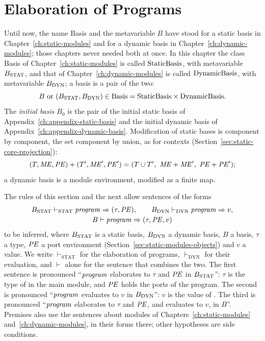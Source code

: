\section{Elaboration of Programs}\label{sec:programs-elaboration}

Until now, the name Basis and the metavariable $B$ have stood for a static
basis in Chapter~\ref{ch:static-modules} and for a dynamic basis in
Chapter~\ref{ch:dynamic-modules}; those chapters never needed both at once.
In this chapter the class Basis of Chapter~\ref{ch:static-modules} is called
$\mathrm{StaticBasis}$, with metavariable $B_{\mathrm{STAT}}$, and that of
Chapter~\ref{ch:dynamic-modules} is called $\mathrm{DynamicBasis}$, with
metavariable $B_{\mathrm{DYN}}$; a basis is a pair of the two:
\[
  B\ \text{or}\ (\pgBstat,\pgBdyn)\in\Basis=\pgStaticBasis\times\pgDynamicBasis .
\]
The \emph{initial basis} $B_0$ is the pair of the initial static basis of
Appendix~\ref{ch:appendix-static-basis} and the initial dynamic basis of
Appendix~\ref{ch:appendix-dynamic-basis}. Modification of static bases is
component by component, the set component by union, as for contexts
(Section~\ref{sec:static-core-projection}):
\[
  (T,\ME,\PE)+(T',\ME',\PE')=(T\cup T',\ \ME+\ME',\ \PE+\PE') ;
\]
a dynamic basis is a module environment, modified as a finite map.

The rules of this section and the next allow sentences of the forms
\[
  \begin{array}{c}
  B_{\mathrm{STAT}} \vdash_{\mathrm{STAT}} \mathit{program} \Rightarrow (\tau,\mathit{PE}),\qquad
  B_{\mathrm{DYN}} \vdash_{\mathrm{DYN}} \mathit{program} \Rightarrow v,\\[0.5ex]
  B \vdash \mathit{program} \Rightarrow (\tau,\mathit{PE},v)
  \end{array}
\]
to be inferred, where $B_{\mathrm{STAT}}$ is a static basis, $B_{\mathrm{DYN}}$ a dynamic basis,
$B$ a basis, $\tau$ a type, $\mathit{PE}$ a port environment
(Section~\ref{sec:static-modules-objects}) and $v$ a value. We write
$\vdash_{\mathrm{STAT}}$ for the elaboration of programs, $\vdash_{\mathrm{DYN}}$
for their evaluation, and $\vdash$ alone for the sentence that combines the
two. The first sentence is pronounced ``$\mathit{program}$ elaborates to $\tau$ and
$\mathit{PE}$ in $B_{\mathrm{STAT}}$'': $\tau$ is the type of  in the main module, and
$\mathit{PE}$ holds the ports of the program. The second is pronounced ``$\mathit{program}$
evaluates to $v$ in $B_{\mathrm{DYN}}$'': $v$ is the value of . The third is
pronounced ``$\mathit{program}$ elaborates to $\tau$ and $\mathit{PE}$, and evaluates to $v$,
in $B$''. Premises also use the sentences about modules of
Chapters~\ref{ch:static-modules} and~\ref{ch:dynamic-modules}, in their forms
there; other hypotheses are side conditions.

